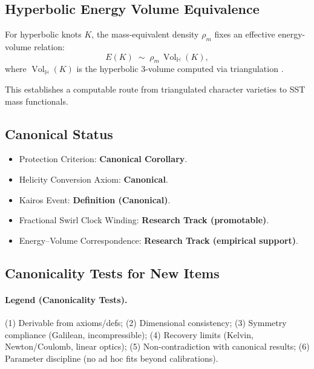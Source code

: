 \documentclass[10pt,reprint,aps,onecolumn,nofootinbib]{revtex4-2}
\newcommand{\Vol}{\operatorname{Vol}}   %
\begin{document}
\subsection{Hyperbolic Energy Volume Equivalence}

\begin{axiom}
    For hyperbolic knots $K$, the mass-equivalent density $\rho_{\!m}$ fixes an effective energy-volume relation:
    \[
        E(K) \;\sim\; \rho_{\!m}\,\Vol_{\!\mathbb{H}}(K),
    \]
    where $\Vol_{\!\mathbb{H}}(K)$ is the hyperbolic 3-volume computed via triangulation \cite{Purcell2025,Petersen2024}.
\end{axiom}

This establishes a computable route from triangulated character varieties to SST mass functionals.

\subsection{Canonical Status}

\begin{itemize}
    \item Protection Criterion: \textbf{Canonical Corollary}.
    \item Helicity Conversion Axiom: \textbf{Canonical}.
    \item Kairos Event: \textbf{Definition (Canonical)}.
    \item Fractional Swirl Clock Winding: \textbf{Research Track (promotable)}.
    \item Energy–Volume Correspondence: \textbf{Research Track (empirical support)}.
\end{itemize}

\subsection{Canonicality Tests for New Items}
\label{app:knot_protection:tests}

\paragraph{Legend (Canonicality Tests).}
(1) Derivable from axioms/defs; (2) Dimensional consistency; (3) Symmetry compliance (Galilean, incompressible);
    (4) Recovery limits (Kelvin, Newton/Coulomb, linear optics); (5) Non-contradiction with canonical results;
    (6) Parameter discipline (no ad hoc fits beyond calibrations).
\end{document}
